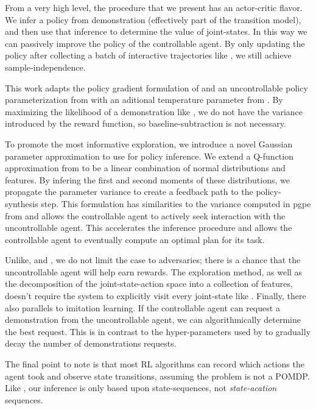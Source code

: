     From a very high level, the procedure that we present has an actor-critic flavor. We infer a policy from
    demonstration (effectively part of the transition model), and then use that inference to determine the value of
    joint-states. In this way we can passively improve the policy of the controllable agent. By only updating the policy
    after collecting a batch of interactive trajectories like \cite{doshi2016hidden}, we still achieve
    sample-independence.

    This work adapts the policy gradient formulation of \cite{herman2016inverse} and an uncontrollable policy
    parameterization from \cite{tangkaratt2014model} with an aditional temperature parameter from
    \cite{nachum2017bridging}.  By maximizing the likelihood of a demonstration like \cite{herman2016inverse}, we do not
    have the variance introduced by the reward function, so baseline-subtraction is not necessary.

    To promote the most informative exploration, we introduce a novel Gaussian parameter approximation to use for policy
    inference. We extend a Q-function approximation from \cite{Sugiyama2015StatisticalRL} to be a linear combination of
    normal distributions and features. By infering the first and second moments of these distributions, we propagate the
    parameter variance to create a feedback path to the policy-synthesis step. This formulation has similarities to the
    variance computed in \ac{pgpe} from \cite{tangkaratt2014model} and allows the controllable agent to actively seek
    interaction with the uncontrollable agent. This accelerates the inference procedure and allows the controllable
    agent to eventually compute an optimal plan for its task.


    Unlike, \cite{lim2013reinforcement} and \cite{bertuccelli2012robust}, we do not limit the case to adversaries; there
    is a chance that the uncontrollable agent will help earn rewards. The exploration method, as well as  the
    decomposition of the joint-state-action space into a collection of features, doesn't require the system to
    explicitly visit every joint-state like \Rmax. Finally, there also parallels to
    imitation learning. If the controllable agent can request a demonstration from the uncontrollable agent, we can
    algorithmically determine the best request. This is in contrast to the hyper-parameters used by \DAGGER to gradually
    decay the number of demonstrations requests.

    The final point to note is that most \ac{RL} algorithms can record which actions the agent took and observe state
    transitions, assuming the problem is not a \ac{POMDP}. Like \cite{lim2013reinforcement}, our inference is only based
    upon state-sequences, not \textit{state-acation} sequences.

